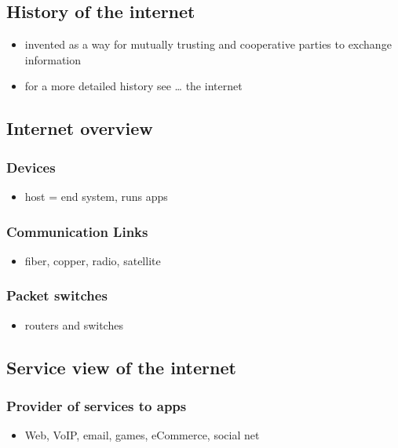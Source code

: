 \documentclass[11pt]{article}
\begin{document}
\subsection*{History of the internet}
\label{sec:orgc4d5556}
\begin{itemize}
\item invented as a way for mutually trusting and cooperative parties to exchange information
\item for a more detailed history see \ldots{} the internet
\end{itemize}
\subsection*{Internet overview}
\label{sec:orgd1e1e88}

\subsubsection*{Devices}
\label{sec:org4f6e596}
\begin{itemize}
\item host = end system, runs apps
\end{itemize}

\subsubsection*{Communication Links}
\label{sec:orgf50f0f4}
\begin{itemize}
\item fiber, copper, radio, satellite
\end{itemize}

\subsubsection*{Packet switches}
\label{sec:orgc53837f}
\begin{itemize}
\item routers and switches
\end{itemize}

\subsection*{Service view of the internet}
\label{sec:org3c3ab40}

\subsubsection*{Provider of services to apps}
\label{sec:org14ce850}
\begin{itemize}
\item Web, VoIP, email, games, eCommerce, social net
\end{itemize}
\end{document}
